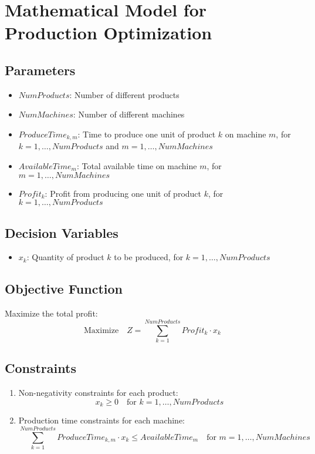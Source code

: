 \documentclass{article}
\begin{document}
\section*{Mathematical Model for Production Optimization}

\subsection*{Parameters}
\begin{itemize}
    \item $NumProducts$: Number of different products
    \item $NumMachines$: Number of different machines
    \item $ProduceTime_{k,m}$: Time to produce one unit of product $k$ on machine $m$, for $k = 1, \ldots, NumProducts$ and $m = 1, \ldots, NumMachines$
    \item $AvailableTime_m$: Total available time on machine $m$, for $m = 1, \ldots, NumMachines$
    \item $Profit_k$: Profit from producing one unit of product $k$, for $k = 1, \ldots, NumProducts$
\end{itemize}

\subsection*{Decision Variables}
\begin{itemize}
    \item $x_k$: Quantity of product $k$ to be produced, for $k = 1, \ldots, NumProducts$
\end{itemize}

\subsection*{Objective Function}
Maximize the total profit:
\[
\text{Maximize} \quad Z = \sum_{k=1}^{NumProducts} Profit_k \cdot x_k
\]

\subsection*{Constraints}
\begin{enumerate}
    \item Non-negativity constraints for each product:
    \[
    x_k \geq 0 \quad \text{for } k = 1, \ldots, NumProducts
    \]
    \item Production time constraints for each machine:
    \[
    \sum_{k=1}^{NumProducts} ProduceTime_{k,m} \cdot x_k \leq AvailableTime_m \quad \text{for } m = 1, \ldots, NumMachines
    \]
\end{enumerate}
\end{document}
